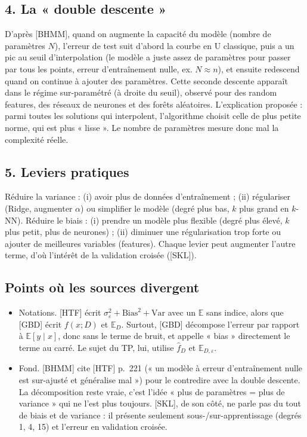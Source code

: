 \documentclass[10pt,a4paper]{article}
\begin{document}
\subsection*{4. La « double descente »}
D'après [BHMM], quand on augmente la capacité du modèle (nombre de paramètres $N$), l'erreur de test suit d'abord la courbe en U classique, puis a un pic au seuil d'interpolation (le modèle a juste assez de paramètres pour passer par tous les points, erreur d'entraînement nulle, ex. $N \approx n$), et ensuite redescend quand on continue à ajouter des paramètres. Cette seconde descente apparaît dans le régime sur-paramétré (à droite du seuil), observé pour des random features, des réseaux de neurones et des forêts aléatoires. L'explication proposée : parmi toutes les solutions qui interpolent, l'algorithme choisit celle de plus petite norme, qui est plus « lisse ». Le nombre de paramètres mesure donc mal la complexité réelle.

\subsection*{5. Leviers pratiques}
Réduire la variance : (i) avoir plus de données d'entraînement ; (ii) régulariser (Ridge, augmenter $\alpha$) ou simplifier le modèle (degré plus bas, $k$ plus grand en $k$-NN).
Réduire le biais : (i) prendre un modèle plus flexible (degré plus élevé, $k$ plus petit, plus de neurones) ; (ii) diminuer une régularisation trop forte ou ajouter de meilleures variables (features). Chaque levier peut augmenter l'autre terme, d'où l'intérêt de la validation croisée ([SKL]).

\subsection*{Points où les sources divergent}
\begin{itemize}
  \item Notations. [HTF] écrit $\sigma_\varepsilon^2 + \mathrm{Bias}^2 + \mathrm{Var}$ avec un $\mathbb{E}$ sans indice, alors que [GBD] écrit $f(x;D)$ et $\mathbb{E}_D$. Surtout, [GBD] décompose l'erreur par rapport à $\mathbb{E}[y\mid x]$, donc sans le terme de bruit, et appelle « bias » directement le terme au carré. Le sujet du TP, lui, utilise $\hat f_D$ et $\mathbb{E}_{D,\varepsilon}$.
  \item Fond. [BHMM] cite [HTF] p.~221 (« un modèle à erreur d'entraînement nulle est sur-ajusté et généralise mal ») pour le contredire avec la double descente. La décomposition reste vraie, c'est l'idée « plus de paramètres = plus de variance » qui ne l'est plus toujours. [SKL], de son côté, ne parle pas du tout de biais et de variance : il présente seulement sous-/sur-apprentissage (degrés 1, 4, 15) et l'erreur en validation croisée.
\end{itemize}
\end{document}
